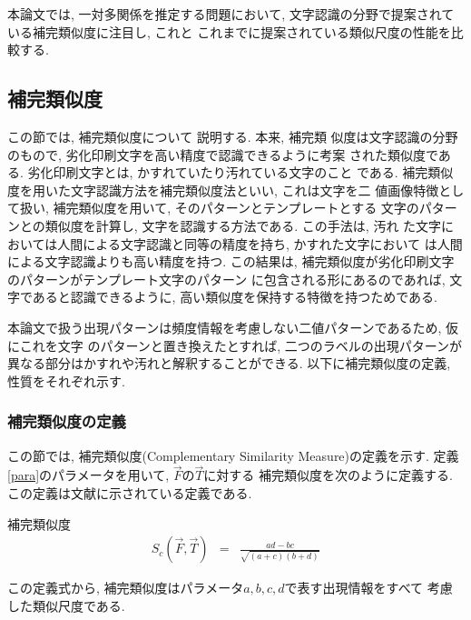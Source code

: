 本論文では, 一対多関係を推定する問題において,
文字認識の分野で提案されている補完類似度に注目し, これと
これまでに提案されている類似尺度の性能を比較する. 
 
\subsection{補完類似度}
この節では, 補完類似度\cite{Hagita95,Sawaki95a,Sawaki95b}について
説明する. 本来, 補完類
似度は文字認識の分野のもので, 劣化印刷文字を高い精度で認識できるように考案
された類似度である. 劣化印刷文字とは, かすれていたり汚れている文字のこと
である. 補完類似度を用いた文字認識方法を補完類似度法といい, これは文字を二
値画像特徴として扱い, 補完類似度を用いて, そのパターンとテンプレートとする
文字のパターンとの類似度を計算し, 文字を認識する方法である. この手法は, 汚れ
た文字においては人間による文字認識と同等の精度を持ち, かすれた文字において
は人間による文字認識よりも高い精度を持つ\cite{Sawaki95a}. 
この結果は, 補完類似度が劣化印刷文字のパターンがテンプレート文字のパターン
に包含される形にあるのであれば, 文字であると認識できるように, 
高い類似度を保持する特徴を持つためである. 

本論文で扱う出現パターンは頻度情報を考慮しない二値パターンであるため, 仮にこれを文字
のパターンと置き換えたとすれば, 
二つのラベルの出現パターンが異なる部分はかすれや汚れと解釈することができる. 
以下に補完類似度の定義, 性質をそれぞれ示す. 

\subsubsection{補完類似度の定義}
この節では, 補完類似度(Complementary Similarity Measure)の定義を示す. 
定義\ref{para}のパラメータを用いて, $\vec{F}$の$\vec{T}$に対する
補完類似度を次のように定義する. 
この定義は文献\cite{Hagita95,Sawaki95a,Sawaki95b}に示されている定義である. 
\begin{df} 補完類似度
\begin{eqnarray}
S_c(\vec{F},\vec{T}) &=& \frac{a d-b c}{\sqrt{(a+c)(b+d)}} 
\label{csm}
\end{eqnarray}
\end{df}
この定義式から, 補完類似度はパラメータ$a,b,c,d$で表す出現情報をすべて
考慮した類似尺度である. 

